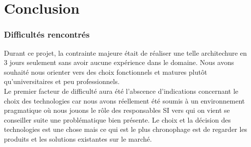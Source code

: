 \documentclass[11pt,a4paper]{report}
\begin{document}
                    
    \part{Conclusion}
        \section{Difficultés rencontrés}
            
            Durant ce projet, la contrainte majeure était de réaliser une telle architechure en 3 jours seulement sans avoir aucune expérience dans le domaine. Nous avons souhaité nous orienter vers des choix fonctionnels et matures plutôt qu'universitaires et peu professionnels.\\
            
            Le premier facteur de difficulté aura été l'abscence d'indications concernant le choix des technologies car nous avons réellement été soumis à un environnement pragmatique où nous jouons le rôle des responsables SI vers qui on vient se conseiller suite une problématique bien présente.
            Le choix et la décision des technologies est une chose mais ce qui est le plus chronophage est de regarder les produits et les solutions existantes sur le marché.\\
            
\end{document}
